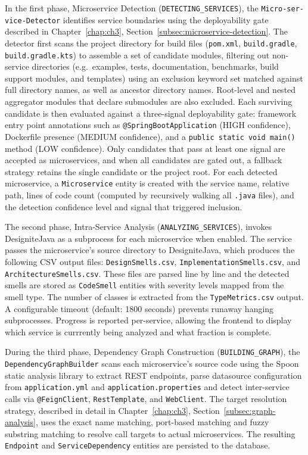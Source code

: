 In the first phase, Microservice Detection (\texttt{DETECTING\_SERVICES}), the \texttt{Micro-ser-vice-De\-tec\-tor} identifies service boundaries using the deployability gate described in Chapter~\ref{chap:ch3}, Section~\ref{subsec:microservice-detection}. The detector first scans the project directory for build files (\texttt{pom.xml}, \texttt{build.gradle}, \texttt{build.gradle.kts}) to assemble a set of candidate modules, filtering out non-service directories (e.g.\ examples, tests, documentation, benchmarks, build support modules, and templates) using an exclusion keyword set matched against full directory names, as well as ancestor directory names. Root-level and nested aggregator modules that declare submodules are also excluded. Each surviving candidate is then evaluated against a three-signal deployability gate: framework entry point annotations such as \texttt{@SpringBootApplication} (HIGH confidence), Dockerfile presence (MEDIUM confidence), and a \texttt{public static void main()} method (LOW confidence). Only candidates that pass at least one signal are accepted as microservices, and when all candidates are gated out, a fallback strategy retains the single candidate or the project root. For each detected microservice, a \texttt{Microservice} entity is created with the service name, relative path, lines of code count (computed by recursively walking all \texttt{.java} files), and the detection confidence level and signal that triggered inclusion.

The second phase, Intra-Service Analysis (\texttt{ANALYZING\_SERVICES}), invokes DesigniteJava as a subprocess for each microservice when enabled. The service passes the microservice's source directory to DesigniteJava, which produces the following CSV output files: \texttt{DesignSmells.csv}, \texttt{ImplementationSmells.csv}, and \texttt{ArchitectureSmells.csv}.
These files are parsed line by line and the detected smells are stored as \texttt{CodeSmell} entities with severity levels mapped from the smell type. The number of classes is extracted from the \texttt{TypeMetrics.csv} output. A configurable timeout (default: 1800 seconds) prevents runaway hanging subprocesses. Progress is reported per-service, allowing the frontend to display which service is currrently being analyzed and what fraction is complete.

During the third phase, Dependency Graph Construction (\texttt{BUILDING\_GRAPH}), the \texttt{DependencyGraphBuilder} scans each microservice's source code using the Spoon static analysis library \cite{Pawlak2016} to extract REST endpoints, parse datasource configuration from \texttt{application.yml} and \texttt{application.properties} and detect inter-service calls via \texttt{@FeignClient}, \texttt{RestTemplate}, and \texttt{WebClient}. The target resolution strategy, described in detail in Chapter~\ref{chap:ch3}, Section~\ref{subsec:graph-analysis}, uses the exact name matching, port-based matching and fuzzy substring matching to resolve call targets to actual microservices. The resulting \texttt{Endpoint} and \texttt{Ser\-viceDe\-pen\-den\-cy} entities are persisted to the database.

